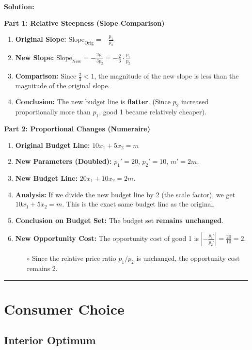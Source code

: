 \documentclass{article}
\begin{document}
\textbf{Solution:}

\textbf{Part 1: Relative Steepness (Slope Comparison)}
\begin{enumerate}
    \item \textbf{Original Slope:} $\text{Slope}_{\text{Orig}} = -\frac{p_1}{p_2}$
    \item \textbf{New Slope:} $\text{Slope}_{\text{New}} = -\frac{2p_1}{3p_2} = -\frac{2}{3} \cdot \frac{p_1}{p_2}$
    \item \textbf{Comparison:} Since $\frac{2}{3} < 1$, the magnitude of the new slope is less than the magnitude of the original slope.
    \item \textbf{Conclusion:} The new budget line is \textbf{flatter}. (Since $p_2$ increased proportionally more than $p_1$, good 1 became relatively cheaper).
\end{enumerate}

\textbf{Part 2: Proportional Changes (Numeraire)}
\begin{enumerate}
    \item \textbf{Original Budget Line:} $10x_1 + 5x_2 = m$
    \item \textbf{New Parameters (Doubled):} $p_1'=20$, $p_2'=10$, $m'=2m$.
    \item \textbf{New Budget Line:} $20x_1 + 10x_2 = 2m$.
    \item \textbf{Analysis:} If we divide the new budget line by 2 (the scale factor), we get $10x_1 + 5x_2 = m$. This is the exact same budget line as the original.
    \item \textbf{Conclusion on Budget Set:} The budget set \textbf{remains unchanged}.
    \item \textbf{New Opportunity Cost:} The opportunity cost of good 1 is $|-\frac{p_1'}{p_2'}| = \frac{20}{10} = 2$.
    \begin{itemize}
        \item[$\circ$] Since the relative price ratio $p_1/p_2$ is unchanged, the opportunity cost remains 2.
    \end{itemize}
\end{enumerate}
\noindent\rule{\linewidth}{0.4pt}

\section{Consumer Choice}
\subsection{Interior Optimum}
\end{document}
